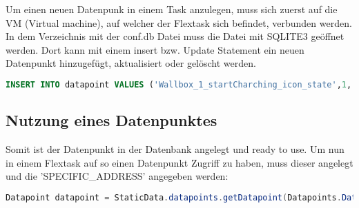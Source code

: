 Um einen neuen Datenpunk in einem Task anzulegen, muss sich zuerst auf die VM (Virtual machine),  auf welcher der Flextask sich befindet, verbunden werden. In dem Verzeichnis mit der conf.db Datei muss die Datei mit SQLITE3 geöffnet werden. Dort kann mit einem insert bzw. Update Statement ein neuen Datenpunkt hinzugefügt, aktualisiert oder gelöscht werden.

\begin{lstlisting}[language=sql,caption=SQL Example,label=lst:impl:foo]
    INSERT INTO datapoint VALUES ('Wallbox_1_startCharching_icon_state',1,'' ,'state_[Wallbox_1_startCharching_icon]','','','INT',-1,-1,0.0,'');
\end{lstlisting}

\subsection{Nutzung eines Datenpunktes} 

Somit ist der Datenpunkt in der Datenbank angelegt und ready to use. Um nun in einem Flextask auf so einen Datenpunkt Zugriff zu haben, muss dieser angelegt und die 'SPECIFIC\_ADDRESS' angegeben werden:

\begin{lstlisting}[language=java,caption=Alengen eines Datenpunktes,label=lst:impl:foo]
    Datapoint datapoint = StaticData.datapoints.getDatapoint(Datapoints.DatapointField.SPECIFIC_ADDRESS, "SPECIFIC_ADDRESS_DES_DATENPUNKTES"); 
\end{lstlisting}

